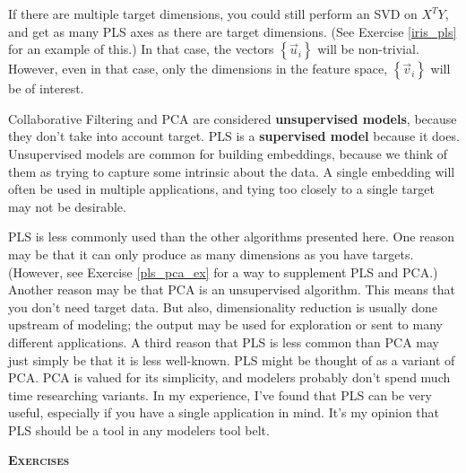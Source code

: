 \documentclass{amsbook}
\begin{document}
If there are multiple target dimensions, you could still perform an SVD on $X^TY$, and get as many PLS axes as there are target dimensions.  (See Exercise \ref{iris_pls} for an example of this.)  In that case, the vectors $\left\{\vec u_i\right\}$ will be non-trivial.  However, even in that case, only the dimensions in the feature space, $\left\{\vec v_i\right\}$ will be of interest.

Collaborative Filtering and PCA are considered {\bf unsupervised models}, because they don't take into account target.  PLS is a {\bf supervised model} because it does.  Unsupervised models are common for building embeddings, because we think of them as trying to capture some intrinsic about the data.  A single embedding will often be used in multiple applications, and tying too closely to a single target may not be desirable.

PLS is less commonly used than the other algorithms presented here.  One reason may be that it can only produce as many dimensions as you have targets.  (However, see Exercise \ref{pls_pca_ex} for a way to supplement PLS and PCA.)  Another reason may be that PCA is an unsupervised algorithm.  This means that you don't need target data.  But also, dimensionality reduction is usually done upstream of modeling; the output may be used for exploration or sent to many different applications.  A third reason that PLS is less common than PCA may just simply be that it is less well-known.  PLS might be thought of as a variant of PCA.  PCA is valued for its simplicity, and modelers probably don't spend much time researching variants.  In my experience, I've found that PLS can be very useful, especially if you have a single application in mind.  It's my opinion that PLS should be a tool in any modelers tool belt.

{\bfseries\scshape\Large Exercises}
\end{document}

